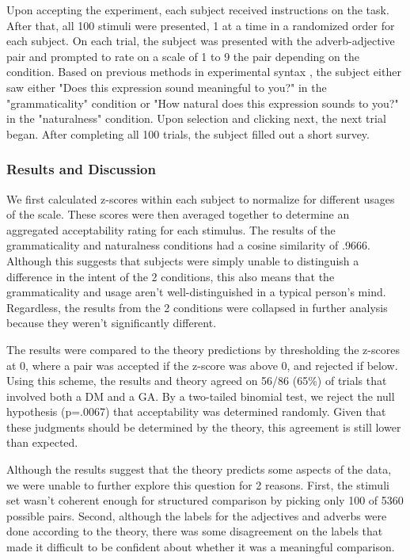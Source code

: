 \documentclass[11pt]{article}
\begin{document}
Upon accepting the experiment, each subject received instructions on the task. After that, all 100 stimuli were presented, 1 at a time in a randomized order for each subject. On each trial, the subject was presented with the adverb-adjective pair and prompted to rate on a scale of 1 to 9 the pair depending on the condition. Based on previous methods in experimental syntax \cite{sprouse}, the subject either saw either "Does this expression sound meaningful to you?" in the "grammaticality" condition or "How natural does this expression sounds to you?" in the "naturalness" condition. Upon selection and clicking next, the next trial began. After completing all 100 trials, the subject filled out a short survey.

\subsubsection{Results and Discussion}

We first calculated z-scores within each subject to normalize for different usages of the scale. These scores were then averaged together to determine an aggregated acceptability rating for each stimulus. The results of the grammaticality and naturalness conditions had a cosine similarity of .9666. Although this suggests that subjects were simply unable to distinguish a difference in the intent of the 2 conditions, this also means that the grammaticality and usage aren't well-distinguished in a typical person's mind. Regardless, the results from the 2 conditions were collapsed in further analysis because they weren't significantly different.

The results were compared to the theory predictions by thresholding the z-scores at 0, where a pair was accepted if the z-score was above 0, and rejected if below. Using this scheme, the results and theory agreed on 56/86 (65\%) of trials that involved both a DM and a GA. By a two-tailed binomial test, we reject the null hypothesis (p=.0067) that acceptability was determined randomly. Given that these judgments should be determined by the theory, this agreement is still lower than expected.

Although the results suggest that the theory predicts some aspects of the data, we were unable to further explore this question for 2 reasons. First, the stimuli set wasn't coherent enough for structured comparison by picking only 100 of 5360 possible pairs. Second, although the labels for the adjectives and adverbs were done according to the theory, there was some disagreement on the labels that made it difficult to be confident about whether it was a meaningful comparison.
\end{document}

